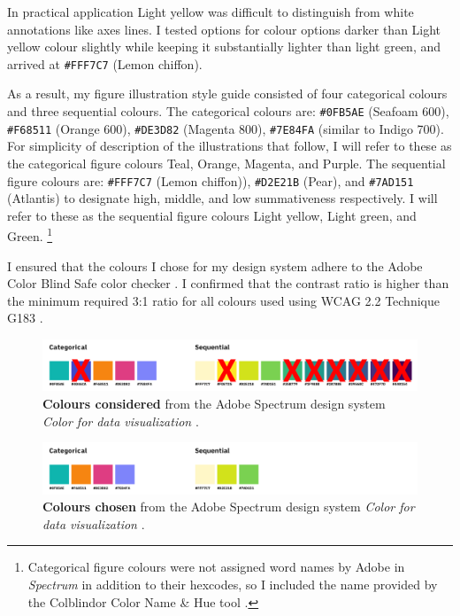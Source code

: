 In practical application Light yellow was difficult to distinguish from white annotations like axes lines. I tested options for colour options darker than Light yellow colour slightly while keeping it substantially lighter than light green, and arrived at \texttt{\#FFF7C7} (Lemon chiffon). 

As a result, my figure illustration style guide consisted of four categorical colours and three sequential colours. The categorical colours are: \texttt{\#0FB5AE} (Seafoam 600), \texttt{\#F68511} (Orange 600), \texttt{\#DE3D82} (Magenta 800), \texttt{\#7E84FA} (similar to Indigo 700). For simplicity of description of the illustrations that follow, I will refer to these as the categorical figure colours Teal, Orange, Magenta, and Purple. The sequential figure colours are: \texttt{\#FFF7C7} (Lemon chiffon)), \texttt{\#D2E21B} (Pear), and \texttt{\#7AD151} (Atlantis) to designate high, middle, and low summativeness respectively. I will refer to these as the sequential figure colours Light yellow, Light green, and Green.
\footnote{Categorical figure colours were not assigned word names by Adobe in \textit{Spectrum}\citep{adobe_color_2022} in addition to their hexcodes, so I included the name provided by the Colblindor Color Name \& Hue tool \citep{fluck_color_2021}.}

I ensured that the colours I chose for my design system adhere to the Adobe Color Blind Safe color checker \citep{adobe_accessibility_2024}. I confirmed that the contrast ratio is higher than the minimum required 3:1 ratio for all colours used using WCAG 2.2 Technique G183 \citep{world_wide_web_consortium_w3c_technique_2024}.



\FloatBarrier   
\begin{figure}[h!]
    \centering
    \includegraphics[width=\textwidth]{figures/5 considered.png}
    \caption[Colours considered]{\textbf{Colours considered} from the Adobe Spectrum design system \textit{Color for data visualization} \citep{adobe_color_2022}.}
    \label{5 considered}
\end{figure}

\begin{figure}[h!]
    \centering
    \includegraphics[width=\textwidth]{figures/5 selected.png}
    \caption[Colours chosen]{\textbf{Colours chosen} from the Adobe Spectrum design system \textit{Color for data visualization} \citep{adobe_color_2022}.}
    \label{5 selected}
\end{figure}
\FloatBarrier  

